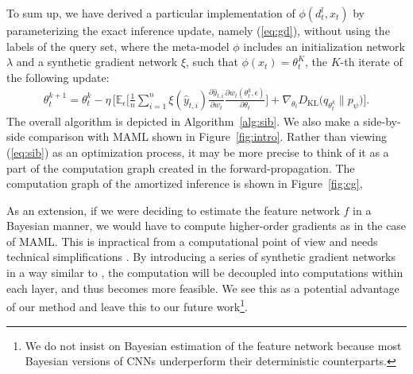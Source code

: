 \documentclass{article} \usepackage{iclr2020_conference,times}
\def\eqref#1{(\ref{#1})}
\newcommand{\E}{\mathbb{E}}
\newcommand{\nt}{n}
\begin{document}
To sum up, we have derived a particular implementation of $\phi(d_t^l,x_t)$ by parameterizing the exact inference update, 
namely \eqref{eq:gd}, without using the labels of the query set,
where the meta-model $\phi$ includes an initialization network $\lambda$ and a synthetic gradient network $\xi$,
such that $\phi(x_t) = \theta_t^K$, the $K$-th iterate of the following update: 
\begin{align}
    \label{eq:sib}
    \theta_t^{k+1} = \theta_t^k - \eta \, \Big[ 
    \E_\epsilon \Big[ {\frac{1}{n} \sum_{i=1}^{\nt}} \xi(\hat{y}_{t,i}) \frac{\partial \hat{y}_{t,i}}{\partial w_t} 
    \frac{\partial w_t(\theta_t^{k}, \epsilon)}{\partial \theta_t} \Big]
    + \nabla_{\theta_t} D_\text{KL}\Big( q_{\theta_t^k} \| p_{\psi} \Big)
    \Big].
\end{align}
The overall algorithm is depicted in Algorithm~\ref{alg:sib}. 
We also make a side-by-side comparison with MAML shown in Figure~\ref{fig:intro}.
Rather than viewing \eqref{eq:sib} as an optimization process, it may be more precise to think of it as a part of the computation graph created in the forward-propagation. 
The computation graph of the amortized inference is shown in Figure~\ref{fig:cg},

As an extension, if we were deciding to estimate the feature network $f$ in a Bayesian manner, 
we would have to compute higher-order gradients as in the case of MAML.
This is inpractical from a computational point of view and needs technical simplifications \citep{nichol2018first}. 
By introducing a series of synthetic gradient networks in a way similar to \citet{jaderberg2017decoupled}, the computation will be decoupled into computations within each layer, and thus becomes more feasible. 
We see this as a potential advantage of our method
and leave this to our future work\footnote{We do not insist on Bayesian estimation of the feature network because 
most Bayesian versions of CNNs underperform their deterministic counterparts.}.
\end{document}
